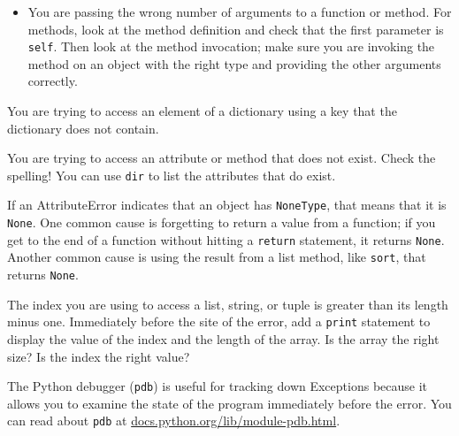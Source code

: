 \documentclass[10pt]{book}
\begin{document}
{\begin{description}
\begin{itemize}

\item You are passing the wrong number of arguments to a function or method.
For methods, look at the method definition and
check that the first parameter is {\tt self}.  Then look at the
method invocation; make sure you are invoking the method on an
object with the right type and providing the other arguments
correctly.

\end{itemize}

\item[KeyError:]  You are trying to access an element of a dictionary
using a key that the dictionary does not contain.


\item[AttributeError:] You are trying to access an attribute or method
that does not exist.  Check the spelling!  You can use
{\tt dir} to list the attributes that do exist.

If an AttributeError indicates that an object has {\tt NoneType},
that means that it is {\tt None}.  One common cause is forgetting
to return a value from a function; if you get to the end of
a function without hitting a {\tt return} statement, it returns
{\tt None}.  Another common cause is using the result from
a list method, like {\tt sort}, that returns {\tt None}.


\item[IndexError:] The index you are using
to access a list, string, or tuple is greater than
its length minus one.  Immediately before the site of the error,
add a {\tt print} statement to display
the value of the index and the length of the array.
Is the array the right size?  Is the index the right value?


\end{description}


The Python debugger ({\tt pdb}) is useful for tracking down
Exceptions because it allows you to examine the state of the
program immediately before the error.  You can read
about {\tt pdb} at \url{docs.python.org/lib/module-pdb.html}.


}
\end{document}

